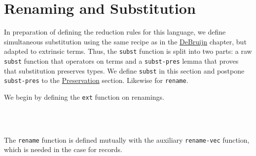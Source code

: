 \hypertarget{renaming-and-substitution}{%
\section{Renaming and Substitution}\label{renaming-and-substitution}}

In preparation of defining the reduction rules for this language, we
define simultaneous substitution using the same recipe as in the
\protect\hyperlink{DeBruijn}{DeBruijn} chapter, but adapted to extrinsic
terms. Thus, the \texttt{subst} function is split into two parts: a raw
\texttt{subst} function that operators on terms and a
\texttt{subst-pres} lemma that proves that substitution preserves types.
We define \texttt{subst} in this section and postpone
\texttt{subst-pres} to the
\protect\hyperlink{subtyping-preservation}{Preservation} section.
Likewise for \texttt{rename}.

We begin by defining the \texttt{ext} function on renamings.

\begin{fence}
\begin{code}%
\>[0]\AgdaSpace{}%
\AgdaSymbol{:}\AgdaSpace{}%
\AgdaSymbol{(}\AgdaSpace{}%
\AgdaSpace{}%
\AgdaSymbol{)}\AgdaSpace{}%
\AgdaSpace{}%
\AgdaSymbol{(}\AgdaSpace{}%
\AgdaSpace{}%
\AgdaSymbol{)}\<%
\\
\>[0]\AgdaSpace{}%
\AgdaSpace{}%
%
\>[13]\AgdaSymbol{=}%
\>[16]\<%
\\
\>[0]\AgdaSpace{}%
\AgdaSpace{}%
\AgdaSymbol{(}\AgdaSpace{}%
\AgdaSymbol{)}%
\>[15]\AgdaSymbol{=}%
\>[18]\AgdaSpace{}%
\AgdaSymbol{(}\AgdaSpace{}%
\AgdaSymbol{)}\<%
\end{code}
\end{fence}

The \texttt{rename} function is defined mutually with the auxiliary
\texttt{rename-vec} function, which is needed in the case for records.

